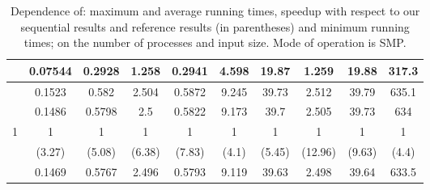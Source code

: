 \begin{table}[ht]
\begin{tabular}{c|c|c|c|c|c|c|c|c|c|}
 & 0.07544 & 0.2928 & 1.258 & 0.2941 & 4.598 & 19.87 & 1.259 & 19.88 & 317.3 \\
\hline
 & 0.1523 & 0.582 & 2.504 & 0.5872 & 9.245 & 39.73 & 2.512 & 39.79 & 635.1 \\
 & 0.1486 & 0.5798 & 2.5 & 0.5822 & 9.173 & 39.7 & 2.505 & 39.73 & 634 \\
1 & 1 & 1 & 1 & 1 & 1 & 1 & 1 & 1 & 1 \\
 & (3.27) & (5.08) & (6.38) & (7.83) & (4.1) & (5.45) & (12.96) & (9.63) & (4.4) \\
 & 0.1469 & 0.5767 & 2.496 & 0.5793 & 9.119 & 39.63 & 2.498 & 39.64 & 633.5 \\
\hline
\end{tabular}
\caption{Dependence of: maximum and average running times, speedup with respect to our sequential results and reference results (in parentheses) and minimum running times; on the number of processes and input size. Mode of operation is SMP.}
\end{table}

